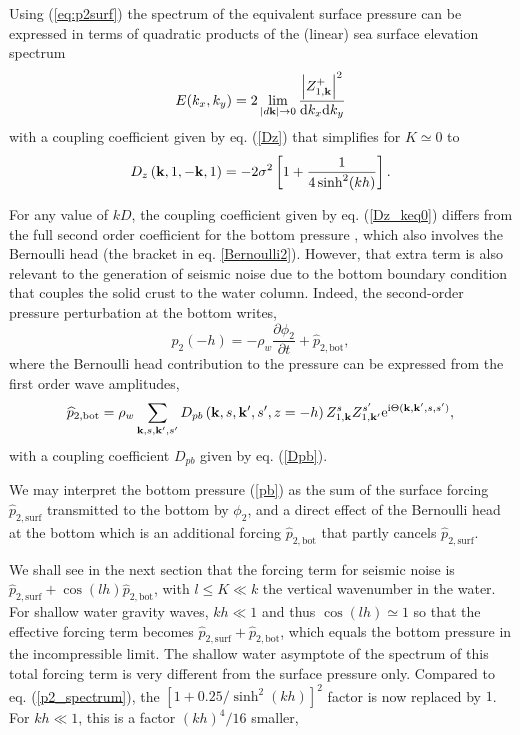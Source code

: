 Using (\ref{eq:p2surf}) the spectrum of the equivalent surface pressure can be expressed in terms of quadratic products of the (linear) sea surface elevation spectrum   
\begin{equation}
E(k_x,k_y)  = 2 \lim_{\left|d \mathbf{k} \right| \rightarrow 0 } \frac{\left|Z_{1,\mathbf{k}}^{+}\right|^2}{\mathrm{d}k_x \mathrm{d}k_y}
\end{equation}
with a coupling coefficient given by eq. (\ref{Dz}) that simplifies for $K \simeq 0$ to   
\begin{equation}
   D_z\left(\mathbf{k},1,-\mathbf{k},1\right)   =  - 2 \sigma^2\left[1 + \frac{1}{4 \sinh^2(kh)}\right]. \label{Dz_keq0}
\end{equation}

For any value of $kD$, 
the coupling coefficient given by eq. (\ref{Dz_keq0}) differs from the full second order coefficient for the bottom pressure
\citep[e.g. eq. 4 in][]{Herbers&Guza1991}, 
which also involves the Bernoulli head (the bracket in eq. \ref{Bernoulli2}). However, that extra term 
is also relevant to the generation of seismic noise due to the  
bottom boundary condition that couples the solid crust to the water column. Indeed, the second-order 
pressure perturbation at the bottom writes, 
\begin{equation}
p_2(-h)=- \rho_w \frac{\partial \phi_2}{\partial t} + \widehat{p}_{2,\mathrm{bot}}, \label{pb}
\end{equation}
where the Bernoulli head contribution to the pressure can be expressed from the first order wave amplitudes, 
\begin{equation}
\widehat{p}_{2,\mathrm{bot}}= \rho_w \sum_{\mathbf{k},s,\mathbf{k^{\prime}},s'}  D_{pb} \left(\mathbf{k},s,\mathbf{k^{\prime}},s',z=-h\right) Z_{1,\mathbf{k}}^{s} Z_{1,\mathbf{k^{\prime}}}^{s'} 
 \mathrm{e}^{\mathrm{i}
     \Theta(\mathbf{k},\mathbf{k^{\prime}},s,s')}\label{P2bot},
\end{equation}
with a coupling coefficient $D_{pb}$ given by eq. (\ref{Dpb}).

We may interpret the bottom pressure (\ref{pb}) as the sum of the surface forcing $\widehat{p}_{2,\mathrm{surf}}$ transmitted 
to the bottom by  $\phi_2$, and  a direct effect of the Bernoulli head at the bottom which 
is an additional forcing $\widehat{p}_{2,\mathrm{bot}}$ that partly cancels $\widehat{p}_{2,\mathrm{surf}}$. 

We shall see in the next section that the forcing term for seismic noise 
is $\widehat{p}_{2,\mathrm{surf}} +\cos(lh) \widehat{p}_{2,\mathrm{bot}}$, with $l \leq K \ll k$ 
the vertical wavenumber in the water.  For shallow water gravity waves, $kh \ll 1$ and thus $\cos(lh) \simeq 1$ so that 
the effective forcing term becomes $\widehat{p}_{2,\mathrm{surf}} + \widehat{p}_{2,\mathrm{bot}}$, 
which equals the bottom pressure in the  incompressible limit. 
The shallow water asymptote of the spectrum of this total forcing term is 
very different from the surface pressure only. Compared to eq. (\ref{p2_spectrum}), 
the  $\left[1  + 0.25 / \sinh^2(kh)\right]^2$ factor is now replaced by 
$1$. For $kh \ll 1$, this is a factor $(kh)^4/16$ smaller,



